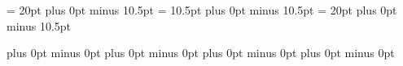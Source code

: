 \pagestyle{fancy}               %
\renewcommand{\chaptermark}[1]{%
    \markboth{\chaptername~\ #1}{}}
\fancyhf{}%
\fancyhead[CO]{\songti \wuhao \leftmark}    %
\fancyfoot[C]{\songti \xiaowu \thepage}   %
\renewcommand{\headrulewidth}{0.5pt}        %
\renewcommand{\footrulewidth}{0pt}          %
\setlength{\footskip}{20pt}                 %

\fancypagestyle{plain}{%
    \fancyhf{}                  %
    \fancyfoot[C]{\songti \xiaowu \thepage}  %
    \renewcommand{\headrulewidth}{0pt}          %
    \renewcommand{\footrulewidth}{0pt}          %
}

\renewcommand{\bibname}{参考文献}

\renewcommand{\tablename}{表}
\renewcommand{\thetable}{\arabic{chapter}-\arabic{table}}
\renewcommand{\figurename}{图}
\renewcommand{\thefigure}{\arabic{chapter}-\arabic{figure}}
\renewcommand{\thesubfigure}{(\alph{subfigure})}
\renewcommand{\thesubtable}{(\alph{subtable})}
\newcommand{\tabfont}{\fontsize{10.5}{20}\selectfont}     %
\captionsetup{labelsep=space}   %
\captionsetup{font=singlespacing,labelsep=space}%
\captionsetup[subfloat]{labelformat=simple}
\renewcommand{\captionfont}{\fontsize{12pt}{20pt}\selectfont}
\captionsetup[table]{position=top,skip=0pt}
\captionsetup[figure]{position=bottom,skip=0pt,belowskip=-10.5pt}
\textfloatsep = 20pt plus 0pt minus 10.5pt
\floatsep = 10.5pt plus 0pt minus 10.5pt
\intextsep= 20pt plus 0pt minus 10.5pt

\renewcommand{\theequation}{\arabic{chapter}-\arabic{equation}}
\abovedisplayskip=10.5pt plus 0pt minus 0pt
\belowdisplayskip=10.5pt plus 0pt minus 0pt
\abovedisplayshortskip=10.5pt plus 0pt minus 0pt
\belowdisplayshortskip=10.5pt plus 0pt minus 0pt











